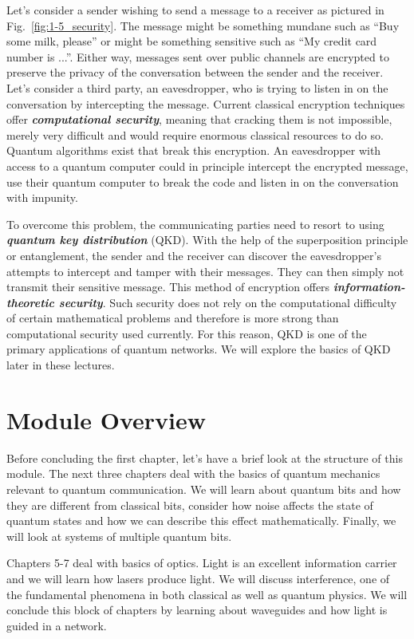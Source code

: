 Let's consider a sender wishing to send a message to a receiver as pictured in Fig.~\ref{fig:1-5_security}.
The message might be something mundane such as ``Buy some milk, please'' or might be something sensitive such as ``My credit card number is ...''.
Either way, messages sent over public channels are encrypted to preserve the privacy of the conversation between the sender and the receiver.
Let's consider a third party, an eavesdropper, who is trying to listen in on the conversation by intercepting the message.
Current classical encryption techniques offer \textit{\textbf{computational security}}, meaning that cracking them is not impossible, merely very difficult and would require enormous classical resources to do so.
Quantum algorithms exist that break this encryption.
An eavesdropper with access to a quantum computer could in principle intercept the encrypted message, use their quantum computer to break the code and listen in on the conversation with impunity.

To overcome this problem, the communicating parties need to resort to using \textit{\textbf{quantum key distribution}} (QKD).
With the help of the superposition principle or entanglement, the sender and the receiver can discover the eavesdropper's attempts to intercept and tamper with their messages.
They can then simply not transmit their sensitive message.
This method of encryption offers \textit{\textbf{information-theoretic security}}.
Such security does not rely on the computational difficulty of certain mathematical problems and therefore is more strong than computational security used currently.
For this reason, QKD is one of the primary applications of quantum networks.
We will explore the basics of QKD later in these lectures.

\section{Module Overview}
\label{sec:mod-over}

Before concluding the first chapter, let's have a brief look at the structure of this module.
The next three chapters deal with the basics of quantum mechanics relevant to quantum communication.
We will learn about quantum bits and how they are different from classical bits, consider how noise affects the state of quantum states and how we can describe this effect mathematically.
Finally, we will look at systems of multiple quantum bits.

Chapters 5-7 deal with basics of optics.
Light is an excellent information carrier and we will learn how lasers produce light.
We will discuss interference, one of the fundamental phenomena in both classical as well as quantum physics.
We will conclude this block of chapters by learning about waveguides and how light is guided in a network.

